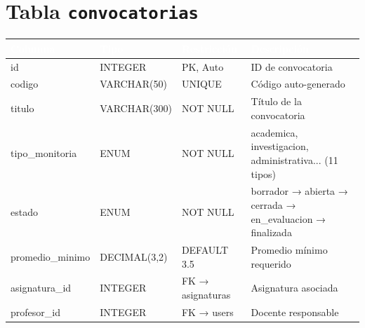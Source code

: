 \documentclass[12pt,a4paper,twoside]{report}
\begin{document}
\section{Tabla \texttt{convocatorias}}
\begin{center}
\begin{tabularx}{\textwidth}{|l|l|l|X|}
\hline
\rowcolor{tableHdr}
\textcolor{white}{\textbf{Columna}} & \textcolor{white}{\textbf{Tipo}} &
\textcolor{white}{\textbf{Restricción}} & \textcolor{white}{\textbf{Descripción}} \\
\hline
\rowcolor{rowOdd}id & INTEGER & PK, Auto & ID de convocatoria \\
\hline\rowcolor{rowEven}codigo & VARCHAR(50) & UNIQUE & Código auto-generado \\
\hline\rowcolor{rowOdd}titulo & VARCHAR(300) & NOT NULL & Título de la convocatoria \\
\hline\rowcolor{rowEven}tipo\_monitoria & ENUM & NOT NULL & academica, investigacion, administrativa... (11 tipos) \\
\hline\rowcolor{rowOdd}estado & ENUM & NOT NULL & borrador → abierta → cerrada → en\_evaluacion → finalizada \\
\hline\rowcolor{rowEven}promedio\_minimo & DECIMAL(3,2) & DEFAULT 3.5 & Promedio mínimo requerido \\
\hline\rowcolor{rowOdd}asignatura\_id & INTEGER & FK → asignaturas & Asignatura asociada \\
\hline\rowcolor{rowEven}profesor\_id & INTEGER & FK → users & Docente responsable \\
\hline
\end{tabularx}
\end{center}
\end{document}
